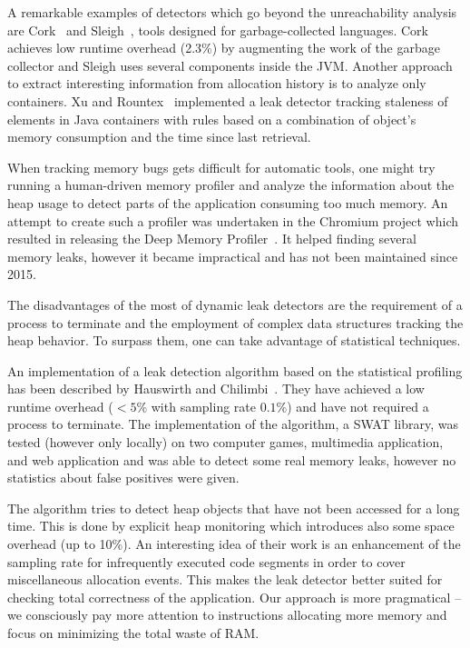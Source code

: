 \documentclass[preprint, numbers]{sigplanconf}
\begin{document}
A remarkable examples of detectors which go beyond the unreachability analysis
are Cork~\cite{cork} and Sleigh~\cite{sleigh}, tools designed for garbage-collected languages.
Cork achieves low runtime overhead (2.3\%) by augmenting the work of the garbage collector
and Sleigh uses several components inside the JVM.
Another approach to extract interesting information from allocation history
is to analyze only containers.
Xu and Rountex~\cite{containers} implemented a leak detector tracking staleness
of elements in Java containers with rules based on a combination of
object's memory consumption and the time since last retrieval.

When tracking memory bugs gets difficult for automatic tools, one might
try running a human-driven memory profiler and analyze the information about the heap usage
to detect parts of the application consuming too much memory.
An attempt to create such a profiler was undertaken in the Chromium project
which resulted in releasing the
Deep Memory Profiler~\cite{deep}.
It helped finding several memory leaks, however it became impractical
and has not been maintained since 2015.

The disadvantages of the most of dynamic leak detectors are the requirement of a process
to terminate and the employment of complex data structures tracking the heap behavior.
To surpass them, one can take advantage of statistical techniques.

An implementation of a leak detection algorithm based on the statistical profiling
has been described by Hauswirth and Chilimbi~\cite{hauswirth}.
They have achieved a low runtime overhead ($<5\%$ with sampling rate $0.1\%$) and have not required a process
to terminate.
The implementation of the algorithm, a SWAT library, was tested (however only locally) on two computer games, multimedia application,
and web application and was able to detect some real memory leaks, however no statistics about false positives were given.

The algorithm tries to detect heap objects that have not been accessed for a long time.
This is done by explicit heap monitoring which introduces also some space overhead (up to 10\%).
An interesting idea of their work is an enhancement of the sampling rate
for infrequently executed code segments in order to cover miscellaneous allocation events.
This makes the leak detector better suited for checking total correctness of
the application.
Our approach is more pragmatical -- we consciously pay more attention to instructions
allocating more memory and focus on minimizing the total waste of RAM.
\end{document}
